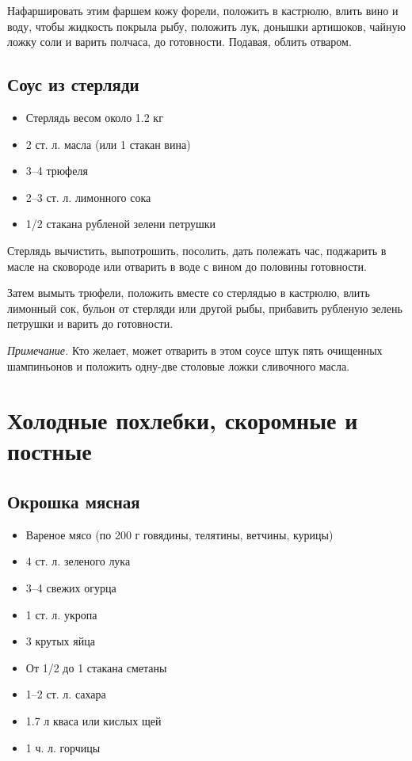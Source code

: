 Нафаршировать этим фаршем кожу форели, положить в кастрюлю, влить вино и воду, чтобы жидкость покрыла рыбу, положить лук, донышки артишоков, чайную ложку соли и варить полчаса, до готовности. Подавая, облить отваром.

\subsection{Соус из стерляди}

\begin{itemize}
	\item Стерлядь весом около 1.2 кг 
    \item 2 ст. л. масла (или 1 стакан вина)
    \item 3–4 трюфеля
    \item 2–3 ст. л. лимонного сока
    \item 1/2 стакана рубленой зелени петрушки
\end{itemize}

Стерлядь вычистить, выпотрошить, посолить, дать полежать час, поджарить в масле на сковороде или отварить в воде с вином до половины готовности.

Затем вымыть трюфели, положить вместе со стерлядью в кастрюлю, влить лимонный сок, бульон от стерляди или другой рыбы, прибавить рубленую зелень петрушки и варить до готовности.

\emph{Примечание.} Кто желает, может отварить в этом соусе штук пять очищенных шампиньонов и положить одну-две столовые ложки сливочного масла.

\newpage
\section{Холодные похлебки, скоромные и постные}

\subsection{Окрошка мясная}

\begin{itemize}
	\item Вареное мясо (по 200 г говядины, телятины, ветчины, курицы) 
    \item 4 ст. л. зеленого лука 
    \item 3–4 свежих огурца 
    \item 1 ст. л. укропа 
    \item 3 крутых яйца 
    \item От 1/2 до 1 стакана сметаны 
    \item 1–2 ст. л. сахара 
    \item 1.7 л кваса или кислых щей 
    \item 1 ч. л. горчицы
\end{itemize}

